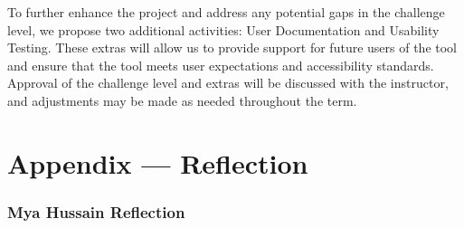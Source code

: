 \documentclass{article}
\begin{document}
\noindent
To further enhance the project and address any potential gaps in the
challenge level,
we propose two additional activities: User Documentation and Usability Testing.
These extras will allow us to provide support for future users of the tool and
ensure that the tool meets user expectations and accessibility standards.\\

\noindent
Approval of the challenge level and extras will be discussed with the
instructor,
and adjustments may be made as needed throughout the term.

\newpage{}

\section*{Appendix --- Reflection}

\subsubsection*{Mya Hussain Reflection}
\end{document}
